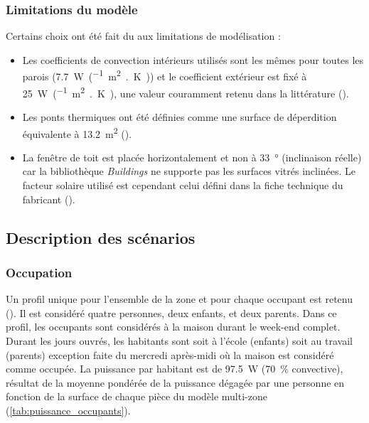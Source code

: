 \subsubsection{Limitations du modèle} %
\label{ssub:limitations_du_modele}
Certains choix ont été fait du aux limitations de modélisation :
\begin{itemize}
    \item Les coefficients de convection intérieurs utilisés sont les mêmes pour toutes
          les parois (\SI{7.7}{\watt\per(\meter\squared{.}\kelvin)}) et le coefficient extérieur
          est fixé à \SI{25}{\watt\per(\meter\squared{.}\kelvin)}, une valeur couramment retenu
          dans la littérature ().
    \item Les ponts thermiques ont été définies comme une surface de déperdition
          équivalente à \SI{13.2}{\meter\squared} ().
    \item La fenêtre de toit est placée horizontalement et non à \SI{33}{\degree}
          (inclinaison réelle) car la bibliothèque \textit{Buildings} ne supporte pas les
          surfaces vitrés inclinées. Le facteur solaire utilisé est cependant celui défini
          dans la fiche technique du fabricant ().
\end{itemize}


\subsection{Description des scénarios} %
\label{sub:description_des_scenarios}
\subsubsection{Occupation} %
\label{ssub:profil_d_occupation}
Un profil unique pour l’ensemble de la zone et pour chaque occupant est retenu (). Il est considéré quatre personnes, deux enfants, et deux parents. Dans ce profil,
les occupants sont considérés à la maison durant le week-end complet. Durant les jours
ouvrés, les habitants sont soit à l’école (enfants) soit au travail (parents) exception
faite du mercredi après-midi où la maison est considéré comme occupée.
La puissance par habitant est de \SI{97.5}{\watt} (\SI{70}{\percent} convective), résultat
de la moyenne pondérée de la puissance dégagée par une personne en fonction de la surface
de chaque pièce du modèle multi-zone (\ref{tab:puissance_occupants}).

